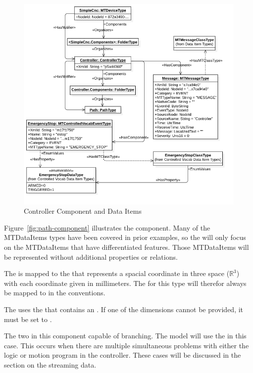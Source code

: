 \begin{figure}[ht]
  \centering
  \includegraphics[width=1.0\textwidth]{diagrams/mtconnect-mapping/controller-component.png}
  \caption{Controller Component and Data Items}
  \label{fig:controller-component}
\end{figure}

Figure~\ref{fig:path-component} illustrates the  component. Many of the \glspl{MTDataItem} types have been covered in prior examples, so the  will only focus on the \glspl{MTDataItem} that have differentiated features. Those \glspl{MTDataItem} will be represented without additional properties or relations.

The  is mapped to the  that represents a spacial coordinate in three space ($\mathbb{R}^{3}$) with each coordinate given in millimeters. The  for this type will therefor always be mapped to  in the  conventions.

The  uses the  that contains an  . If one of the dimensions cannot be provided, it must be set to .

The two  in this component capable of branching. The model will use the  in this case. This occurs when there are multiple simultaneous problems with either the logic or motion program in the controller. These cases will be discussed in the section on the streaming data.

